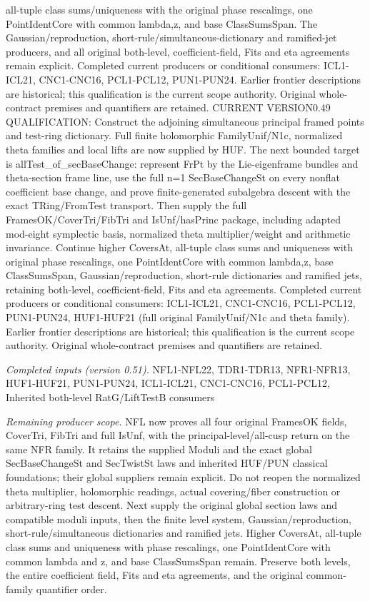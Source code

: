 \documentclass[11pt,a4paper]{article}
\numberwithin{equation}{section}
\theoremstyle{remark}\newtheorem{remark}[theorem]{Remark}
\begin{document}
all-tuple class sums/uniqueness with the original phase rescalings, one PointIdentCore with common lambda,z, and base ClassSumsSpan. The Gaussian/reproduction, short-rule/simultaneous-dictionary and ramified-jet producers, and all original both-level, coefficient-field, Fits and eta agreements remain explicit. Completed current producers or conditional consumers: ICL1-ICL21, CNC1-CNC16, PCL1-PCL12, PUN1-PUN24. Earlier frontier descriptions are historical; this qualification is the current scope authority. Original whole-contract premises and quantifiers are retained. CURRENT VERSION0.49 QUALIFICATION: Construct the adjoining simultaneous principal framed points and test-ring dictionary. Full finite holomorphic FamilyUnif/N1c, normalized theta families and local lifts are now supplied by HUF. The next bounded target is allTest\_\allowbreak of\_\allowbreak secBaseChange: represent FrPt by the Lie-eigenframe bundles and theta-section frame line, use the full n=1 SecBaseChangeSt on every nonflat coefficient base change, and prove finite-generated subalgebra descent with the exact TRing/FromTest transport. Then supply the full FramesOK/CoverTri/FibTri and IsUnf/hasPrinc package, including adapted mod-eight symplectic basis, normalized theta multiplier/weight and arithmetic invariance. Continue higher CoversAt, all-tuple class sums and uniqueness with original phase rescalings, one PointIdentCore with common lambda,z, base ClassSumsSpan, Gaussian/reproduction, short-rule dictionaries and ramified jets, retaining both-level, coefficient-field, Fits and eta agreements. Completed current producers or conditional consumers: ICL1-ICL21, CNC1-CNC16, PCL1-PCL12, PUN1-PUN24, HUF1-HUF21 (full original FamilyUnif/N1c and theta family). Earlier frontier descriptions are historical; this qualification is the current scope authority. Original whole-contract premises and quantifiers are retained.

\emph{Completed inputs (version 0.51).} NFL1-NFL22, TDR1-TDR13, NFR1-NFR13, HUF1-HUF21, PUN1-PUN24, ICL1-ICL21, CNC1-CNC16, PCL1-PCL12, Inherited both-level RatG/LiftTestB consumers

\emph{Remaining producer scope.} NFL now proves all four original FramesOK fields, CoverTri, FibTri and full IsUnf, with the principal-level/all-cusp return on the same NFR family. It retains the supplied Moduli and the exact global SecBaseChangeSt and SecTwistSt laws and inherited HUF/PUN classical foundations; their global suppliers remain explicit. Do not reopen the normalized theta multiplier, holomorphic readings, actual covering/fiber construction or arbitrary-ring test descent. Next supply the original global section laws and compatible moduli inputs, then the finite level system, Gaussian/reproduction, short-rule/simultaneous dictionaries and ramified jets. Higher CoversAt, all-tuple class sums and uniqueness with phase rescalings, one PointIdentCore with common lambda and z, and base ClassSumsSpan remain. Preserve both levels, the entire coefficient field, Fits and eta agreements, and the original common-family quantifier order.
\end{document}
